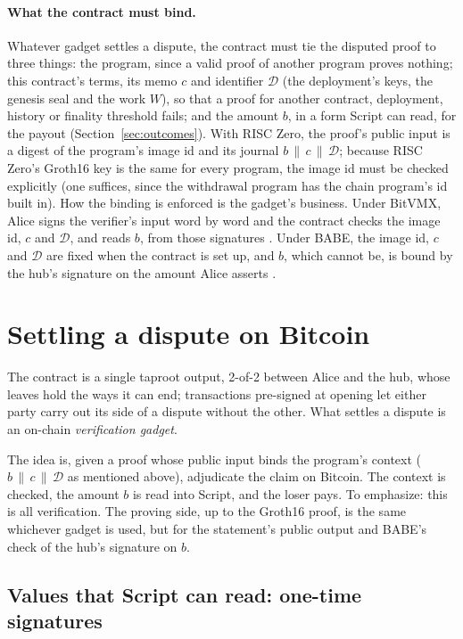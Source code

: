 \documentclass[11pt]{article}
\begin{document}
\paragraph{What the contract must bind.} Whatever gadget settles a
dispute, the contract must tie the disputed proof to three things: the
program, since a valid proof of another program proves nothing; this
contract's terms, its memo $c$ and identifier $\mathcal{D}$ (the deployment's keys,
the genesis seal and the work $W$), so that a proof for another contract,
deployment, history or finality threshold fails; and the amount $b$, in a
form Script can read, for the payout (Section~\ref{sec:outcomes}). With
RISC Zero, the proof's public input is a digest of the program's image id
and its journal $b \,\|\, c \,\|\, \mathcal{D}$; because RISC Zero's Groth16 key is
the same for every program, the image id must be checked explicitly (one
suffices, since the withdrawal program has the chain program's id built
in). How the binding is enforced is the gadget's business. Under BitVMX,
Alice signs the verifier's input word by word and the contract checks the
image id, $c$ and $\mathcal{D}$, and reads $b$, from those signatures
\cite[\S 2]{lichenbitvmx}. Under BABE, the image id, $c$ and $\mathcal{D}$ are fixed
when the contract is set up, and $b$, which cannot be, is bound by the
hub's signature on the amount Alice asserts \cite[\S 5]{lichenbabe}.



\section{Settling a dispute on Bitcoin}
\label{sec:blocks}

The contract is a single taproot output, 2-of-2 between Alice and the
hub, whose leaves hold the ways it can end; transactions pre-signed at
opening let either party carry out its side of a dispute without the
other. What settles a dispute is an on-chain \emph{verification gadget}.

The idea is, given a proof whose public input binds the
program's context ($b \,\|\, c \,\|\, \mathcal{D}$ as mentioned above), adjudicate the
claim on Bitcoin. The context is checked, the amount $b$ is read into Script, and the loser pays. To emphasize: this is all verification. The proving side, up to the Groth16 proof, is the same whichever gadget is used, but for the statement's public output and BABE's check of the hub's signature on $b$.

\subsection{Values that Script can read: one-time signatures}
\end{document}
